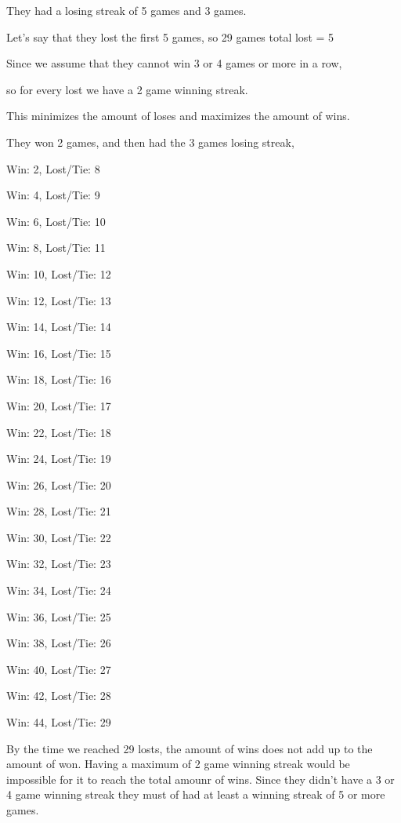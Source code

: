 \documentclass[12pt]{article}
\begin{document}
They had a losing streak of 5 games and 3 games.

Let's say that they lost the first 5 games, so 29 games total lost = 5

Since we assume that they cannot win 3 or 4 games or more in a row,

so for every lost we have a 2 game winning streak. 

This minimizes the amount of loses and maximizes the amount of wins.

They won 2 games, and then had the 3 games losing streak, 


Win: 2, Lost/Tie: 8

Win: 4,  Lost/Tie: 9

Win: 6,  Lost/Tie: 10

Win: 8,  Lost/Tie: 11

Win: 10,  Lost/Tie: 12

Win: 12,  Lost/Tie: 13

Win: 14,  Lost/Tie: 14

Win: 16,  Lost/Tie: 15

Win: 18,  Lost/Tie: 16

Win: 20,  Lost/Tie: 17

Win: 22,  Lost/Tie: 18

Win: 24,  Lost/Tie: 19

Win: 26,  Lost/Tie: 20

Win: 28,  Lost/Tie: 21

Win: 30,  Lost/Tie: 22

Win: 32,  Lost/Tie: 23

Win: 34,  Lost/Tie: 24

Win: 36,  Lost/Tie: 25

Win: 38,  Lost/Tie: 26

Win: 40,  Lost/Tie: 27

Win: 42,  Lost/Tie: 28

Win: 44,  Lost/Tie: 29

By the time we reached 29 losts, the amount of wins does not add up to the amount of won.
Having a maximum of 2 game winning streak would be impossible for it to reach the total amounr of wins.
Since they didn't have a 3 or 4 game winning streak they must of had at least a winning streak of 5 or more games.

\newpage
\end{document}
